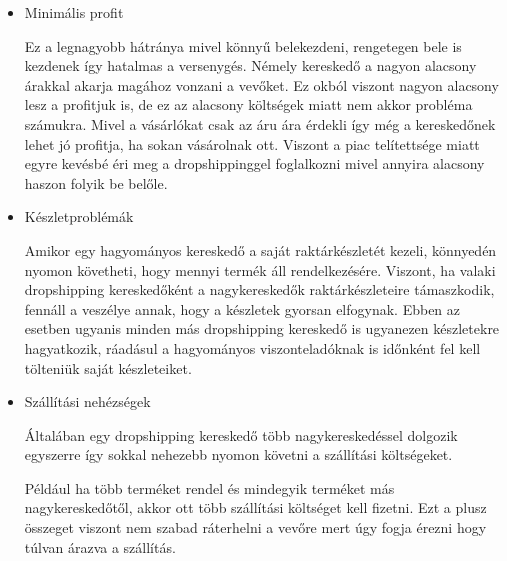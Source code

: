 \begin{itemize}
    \item Minimális profit
    
Ez a legnagyobb hátránya mivel könnyű belekezdeni, rengetegen bele is kezdenek így hatalmas a versenygés. Némely kereskedő a nagyon alacsony árakkal akarja magához vonzani a vevőket. Ez okból viszont nagyon alacsony lesz a profitjuk is, de ez az alacsony költségek miatt nem akkor probléma számukra. Mivel a vásárlókat csak az áru ára érdekli így még a kereskedőnek lehet jó profitja, ha sokan vásárolnak ott. Viszont a piac telítettsége miatt egyre kevésbé éri meg a dropshippinggel foglalkozni mivel annyira alacsony haszon folyik be belőle.

    \item Készletproblémák
    
Amikor egy hagyományos kereskedő a saját raktárkészletét kezeli, könnyedén nyomon követheti, hogy mennyi termék áll rendelkezésére. Viszont, ha valaki dropshipping kereskedőként a nagykereskedők raktárkészleteire támaszkodik, fennáll a veszélye annak, hogy a készletek gyorsan elfogynak. Ebben az esetben ugyanis minden más dropshipping kereskedő is ugyanezen készletekre hagyatkozik, ráadásul a hagyományos viszonteladóknak is időnként fel kell tölteniük saját készleteiket.

    \item Szállítási nehézségek
    
Általában egy dropshipping kereskedő több nagykereskedéssel dolgozik egyszerre így sokkal nehezebb nyomon követni a szállítási költségeket.

Például ha több terméket rendel és mindegyik terméket más nagykereskedőtől, akkor ott több szállítási költséget kell fizetni. Ezt a plusz összeget viszont nem szabad ráterhelni a vevőre mert úgy fogja érezni hogy túlvan árazva a szállítás.

\end{itemize}

